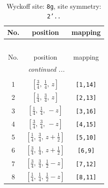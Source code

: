\documentclass[fleqn,8pt]{jsarticle}
\begin{document}
\begin{longtable}{ccc}
\caption{Wyckoff site: {\tt 8g}, site symmetry: {\tt 2'..}}
 \\
 \hline \hline
No. & position & mapping \\ \hline \endfirsthead

\multicolumn{2}{l}{\tablename\ \thetable{}} \\
 \hline \hline
No. & position & mapping \\ \hline \endhead

 \hline \hline
\multicolumn{2}{r}{\footnotesize\it continued ...} \\ \endfoot

 \hline \hline
\multicolumn{2}{r}{} \\ \endlastfoot

1 & $\left[ \frac{3}{4},\, \frac{1}{4},\, z \right]$ & {\tt [1,14]} \\ \hline
2 & $\left[ \frac{1}{4},\, \frac{3}{4},\, z \right]$ & {\tt [2,13]} \\ \hline
3 & $\left[ \frac{1}{4},\, \frac{1}{4},\, - z \right]$ & {\tt [3,16]} \\ \hline
4 & $\left[ \frac{3}{4},\, \frac{3}{4},\, - z \right]$ & {\tt [4,15]} \\ \hline
5 & $\left[ \frac{1}{4},\, \frac{3}{4},\, z + \frac{1}{2} \right]$ & {\tt [5,10]} \\ \hline
6 & $\left[ \frac{3}{4},\, \frac{1}{4},\, z + \frac{1}{2} \right]$ & {\tt [6,9]} \\ \hline
7 & $\left[ \frac{3}{4},\, \frac{3}{4},\, \frac{1}{2} - z \right]$ & {\tt [7,12]} \\ \hline
8 & $\left[ \frac{1}{4},\, \frac{1}{4},\, \frac{1}{2} - z \right]$ & {\tt [8,11]} \\
\end{longtable}
\renewcommand{\arraystretch}{1.2}
\end{document}
